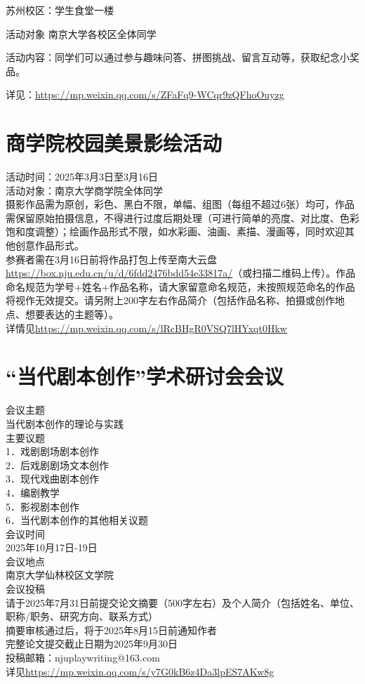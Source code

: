 \documentclass[letterpaper, 12pt]{article}
\begin{document}
\begin{multicols}{2}
苏州校区：学生食堂一楼

活动对象 南京大学各校区全体同学

活动内容：同学们可以通过参与趣味问答、拼图挑战、留言互动等，获取纪念小奖品。

详见：\url{https://mp.weixin.qq.com/s/ZFaFq9-WCqr9zQFhoOuyzg}
\section{商学院校园美景影绘活动}
活动时间：2025年3月3日至3月16日\\
活动对象：南京大学商学院全体同学\\
摄影作品需为原创，彩色、黑白不限，单幅、组图（每组不超过6张）均可，作品需保留原始拍摄信息，不得进行过度后期处理（可进行简单的亮度、对比度、色彩饱和度调整）；绘画作品形式不限，如水彩画、油画、素描、漫画等，同时欢迎其他创意作品形式。\\
参赛者需在3月16日前将作品打包上传至南大云盘\url{https://box.nju.edu.cn/u/d/6fdd2476bdd54e33817a/}（或扫描二维码上传）。作品命名规范为学号+姓名+作品名称，请大家留意命名规范，未按照规范命名的作品将视作无效提交。请另附上200字左右作品简介（包括作品名称、拍摄或创作地点、想要表达的主题等）。\\
详情见\url{https://mp.weixin.qq.com/s/lRcBHgR0VSQ7lHYxqt0Hkw}



\section{“当代剧本创作”学术研讨会会议}
会议主题\\
当代剧本创作的理论与实践\\
主要议题\\
1．戏剧剧场剧本创作\\
2．后戏剧剧场文本创作\\
3．现代戏曲剧本创作\\
4．编剧教学\\
5．影视剧本创作\\
6．当代剧本创作的其他相关议题\\
会议时间\\
2025年10月17日-19日\\
会议地点\\
南京大学仙林校区文学院\\
会议投稿\\
请于2025年7月31日前提交论文摘要（500字左右）及个人简介（包括姓名、单位、职称/职务、研究方向、联系方式）\\
摘要审核通过后，将于2025年8月15日前通知作者\\
完整论文提交截止日期为2025年9月30日\\
投稿邮箱：njuplaywriting@163.com\\
详见\url{https://mp.weixin.qq.com/s/y7G0kB6z4Da3lpES7AKw8g}



\end{multicols}
\end{document}

